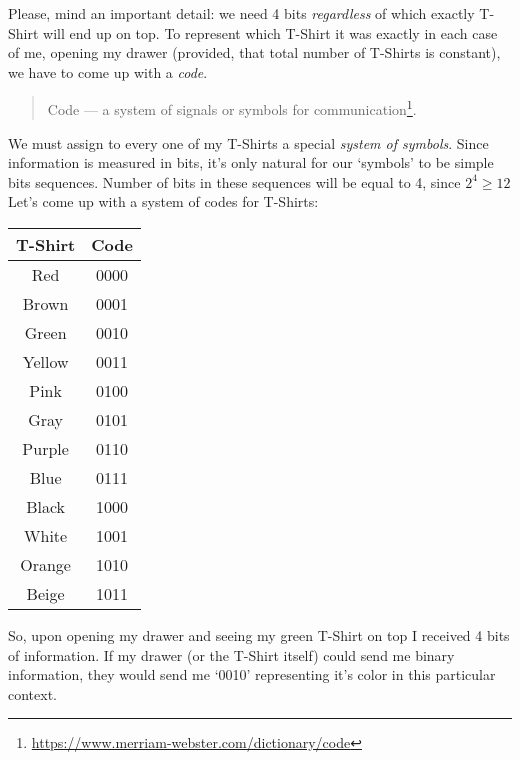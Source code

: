 \documentclass{article}
\begin{document}
            Please, mind an important detail: we need 4 bits \emph{regardless} of which exactly T-Shirt will end up on top. To represent which T-Shirt it was exactly
            in each case of me, opening my drawer (provided, that total number of T-Shirts is constant), we have to come up with a \emph{code}.

            \begin{quote}
                Code --- a system of signals or symbols for communication\footnote{\href{https://www.merriam-webster.com/dictionary/code}{https://www.merriam-webster.com/dictionary/code}}.
            \end{quote}

            We must assign to every one of my T-Shirts a special \emph{system of symbols}. Since information is measured in bits, it's only natural for our `symbols' to 
            be simple bits sequences. Number of bits in these sequences will be equal to 4, since $2^4 \geq 12$\\
            Let's come up with a system of codes for T-Shirts:

            \begin{center}
                \begin{longtable}{|c|c|}
                    \hline
                    T-Shirt & Code \\\hline
                    Red & 0000 \\\hline
                    Brown & 0001 \\\hline
                    Green & 0010 \\\hline
                    Yellow & 0011 \\\hline
                    Pink & 0100 \\\hline
                    Gray & 0101 \\\hline
                    Purple & 0110 \\\hline
                    Blue & 0111 \\\hline
                    Black & 1000 \\\hline
                    White & 1001 \\\hline 
                    Orange & 1010 \\\hline
                    Beige & 1011 \\\hline
                \end{longtable}
            \end{center}

            So, upon opening my drawer and seeing my green T-Shirt on top I received 4 bits of information. If my drawer (or the T-Shirt itself) could send me binary
            information, they would send me `0010' representing it's color in this particular context.\par
\end{document}
